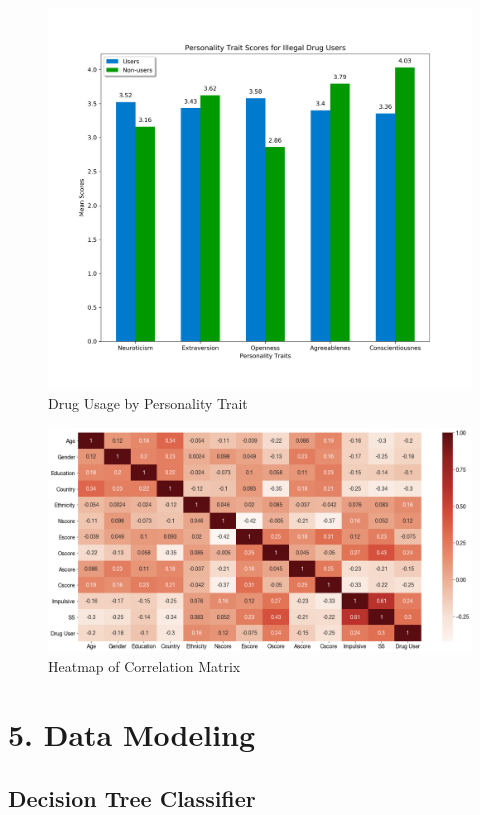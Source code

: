 \documentclass[10pt]{article}
\begin{document}
\begin{figure}[H]
\caption{Drug Usage by Personality Trait}
\centering
\includegraphics[scale=0.25]{traits.png}
\end{figure}

\begin{figure}[H]
\caption{Heatmap of Correlation Matrix}
\centering
\includegraphics[scale=0.25]{heatmap.png}
\end{figure}

\section*{5. Data Modeling}

\subsection*{Decision Tree Classifier}
\end{document}
